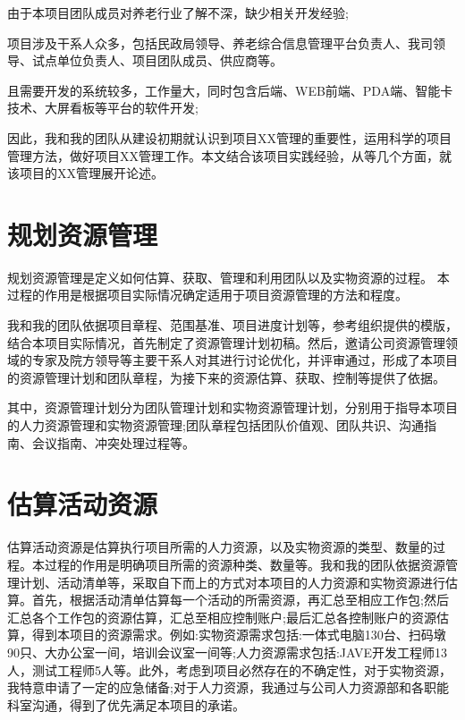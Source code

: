 \documentclass[UTF8]{../computerUniverse}
\begin{document}
由于本项目团队成员对养老行业了解不深，缺少相关开发经验;

项目涉及干系人众多，包括民政局领导、养老综合信息管理平台负责人、我司领导、试点单位负责人、项目团队成员、供应商等。

且需要开发的系统较多，工作量大，同时包含后端、WEB前端、PDA端、智能卡技术、大屏看板等平台的软件开发;

因此，我和我的团队从建设初期就认识到项目XX管理的重要性，运用科学的项目管理方法，做好项目XX管理工作。本文结合该项目实践经验，从等几个方面，就该项目的XX管理展开论述。

\section{规划资源管理}


规划资源管理是定义如何估算、获取、管理和利用团队以及实物资源的过程。
本过程的作用是根据项目实际情况确定适用于项目资源管理的方法和程度。


我和我的团队依据项目章程、范围基准、项目进度计划等，参考组织提供的模版，结合本项目实际情况，首先制定了资源管理计划初稿。然后，邀请公司资源管理领域的专家及院方领导等主要干系人对其进行讨论优化，并评审通过，形成了本项目的资源管理计划和团队章程，为接下来的资源估算、获取、控制等提供了依据。

其中，资源管理计划分为团队管理计划和实物资源管理计划，分别用于指导本项目的人力资源管理和实物资源管理;团队章程包括团队价值观、团队共识、沟通指南、会议指南、冲突处理过程等。


\section{估算活动资源}

估算活动资源是估算执行项目所需的人力资源，以及实物资源的类型、数量的过程。本过程的作用是明确项目所需的资源种类、数量等。我和我的团队依据资源管理计划、活动清单等，采取自下而上的方式对本项目的人力资源和实物资源进行估算。首先，根据活动清单估算每一个活动的所需资源，再汇总至相应工作包;然后汇总各个工作包的资源估算，汇总至相应控制账户;最后汇总各控制账户的资源估算，得到本项目的资源需求。例如:实物资源需求包括:一体式电脑130台、扫码墩90只、大办公室一间，培训会议室一间等;人力资源需求包括:JAVE开发工程师13人，测试工程师5人等。此外，考虑到项目必然存在的不确定性，对于实物资源，我特意申请了一定的应急储备;对于人力资源，我通过与公司人力资源部和各职能科室沟通，得到了优先满足本项目的承诺。
\end{document}
